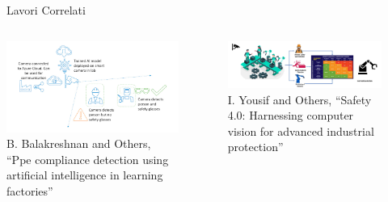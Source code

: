 \documentclass{beamer}
\begin{document}
\begin{frame}{Lavori Correlati}
  \begin{columns}
    \begin{column}{0.5\textwidth}
      \centering
      \includegraphics[width=\textwidth]{images/relw1-system.png}
      \tiny B. Balakreshnan and Others, “Ppe compliance detection using artificial
intelligence in learning factories”
    \end{column}

    \begin{column}{0.5\textwidth}
      \begin{figure}
      \centering
      \includegraphics[width=\textwidth]{images/safety-system.png}
      \tiny {I. Yousif and Others, “Safety 4.0: Harnessing computer vision for
advanced industrial protection”}
	\end{figure} 
    \end{column}
  \end{columns}
\end{frame}

\end{document}
